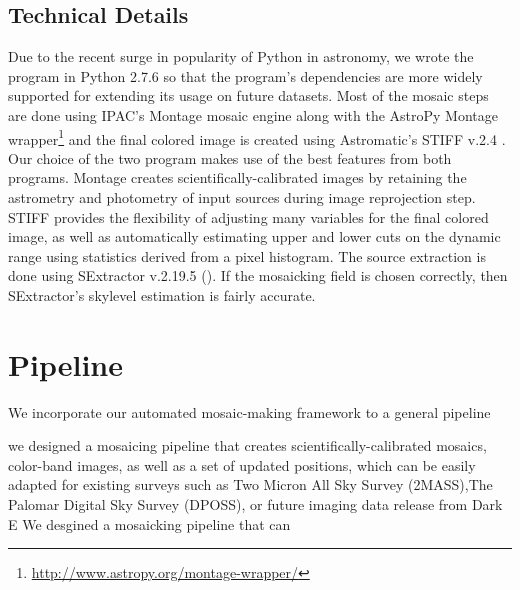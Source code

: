 \documentclass[5p]{elsarticle}
\begin{document}
		\subsection{Technical Details}
		Due to the recent surge in popularity of Python in astronomy, we wrote the program in Python 2.7.6 so that the program's dependencies are more widely supported for extending its usage on future datasets. Most of the mosaic steps are done using IPAC's Montage  \cite{montage} mosaic engine along with the AstroPy Montage wrapper\footnote{\url{http://www.astropy.org/montage-wrapper/}} and the final colored image is created using Astromatic's STIFF v.2.4 \cite{stiff}. Our choice of the two program makes use of the best features from both programs. Montage creates scientifically-calibrated images by retaining the astrometry and photometry of input sources during image reprojection step. STIFF provides the flexibility of adjusting many variables for the final colored image, as well as automatically estimating upper and lower cuts on the dynamic range using statistics derived from a pixel histogram.  %
The source extraction is done using SExtractor v.2.19.5 (\citet{sextractor}). If the mosaicking field is chosen correctly, then SExtractor's skylevel estimation is fairly accurate. 


\section{Pipeline}
We incorporate our automated mosaic-making framework to a general pipeline

we designed a mosaicing pipeline that creates scientifically-calibrated mosaics, color-band images, as well as a set of updated positions, which can be easily adapted for existing surveys such as Two Micron All Sky Survey  (2MASS),The Palomar Digital Sky Survey (DPOSS), or future imaging data release from  Dark E
We desgined a mosaicking pipeline that can 
\end{document}
